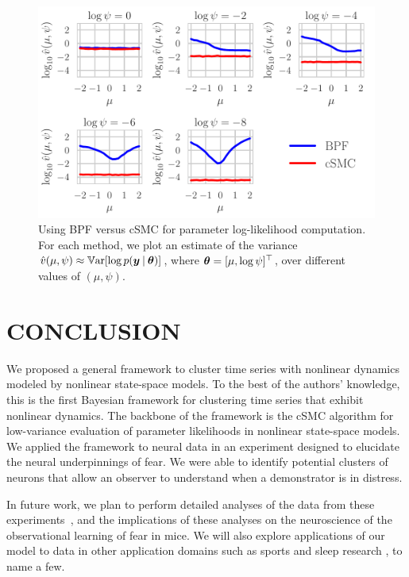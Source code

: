 \documentclass[twoside]{article}
\begin{document}
\begin{figure}[h!]
\begin{center}
\includegraphics[scale=0.42]{../img/bpf-vs-csmc.pdf}
\caption{Using BPF versus cSMC for parameter log-likelihood computation.  For each method, we plot an estimate of the variance $\hat{v}(\mu, \psi) \approx \mathbb{V}\text{ar}[\log p(\boldsymbol{y} \:\vert\: \boldsymbol{\theta})]$, where $\boldsymbol{\theta} = [\mu, \log \psi]^\top$, over different values of $(\mu, \psi)$.} \label{bpf-csmc}
\end{center}
\end{figure}

\section{CONCLUSION}
We proposed a general framework to cluster time series with nonlinear dynamics modeled by nonlinear state-space models. To the best of the authors' knowledge, this is the first Bayesian framework for clustering time series that exhibit nonlinear dynamics. The backbone of the framework is the cSMC algorithm for low-variance evaluation of parameter likelihoods in nonlinear state-space models. We applied the framework to neural data in an experiment designed to elucidate the neural underpinnings of fear. We were able to identify potential clusters of neurons that allow an observer to understand when a demonstrator is in distress.

In future work, we plan to perform detailed analyses of the data from these experiments~\citep{allsop2018corticoamygdala}, and the implications of these analyses on the neuroscience of the observational learning of fear in mice. We will also explore applications of our model to data in other application domains such as sports and sleep research \citep{st2017modeling}, to name a few.
\end{document}
